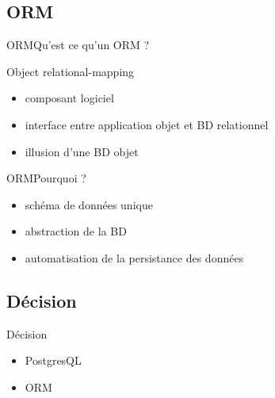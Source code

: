 \subsection{ORM}
\begin{frame}{ORM}{Qu'est ce qu'un ORM ?}
  \begin{block}{Object relational-mapping}
    \begin{itemize}
      \item composant logiciel
      \item interface entre application objet et BD relationnel
      \item illusion d'une BD objet
    \end{itemize}
  \end{block}
\end{frame}

\begin{frame}{ORM}{Pourquoi ?}
  \begin{itemize}
    \item schéma de données unique
    \item abstraction de la BD
    \item automatisation de la persistance des données
  \end{itemize}
\end{frame}

\subsection{Décision}
\begin{frame}{Décision}
  \begin{itemize}
    \item PostgresQL
    \item ORM
  \end{itemize}
\end{frame}
